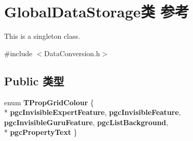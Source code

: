 \hypertarget{class_global_data_storage}{\section{Global\+Data\+Storage类 参考}
\label{class_global_data_storage}
}


This is a singleton class.  




{\ttfamily \#include $<$Data\+Conversion.\+h$>$}

\subsection*{Public 类型}
\begin{DoxyCompactItemize}
\item 
\hypertarget{class_global_data_storage_ac4e147170e7e49025bb5a7af269d7564}{enum {\bfseries T\+Prop\+Grid\+Colour} \{ \\*
{\bfseries pgc\+Invisible\+Expert\+Feature}, 
{\bfseries pgc\+Invisible\+Feature}, 
{\bfseries pgc\+Invisible\+Guru\+Feature}, 
{\bfseries pgc\+List\+Background}, 
\\*
{\bfseries pgc\+Property\+Text}
 \}}\label{class_global_data_storage_ac4e147170e7e49025bb5a7af269d7564}

\end{DoxyCompactItemize}
